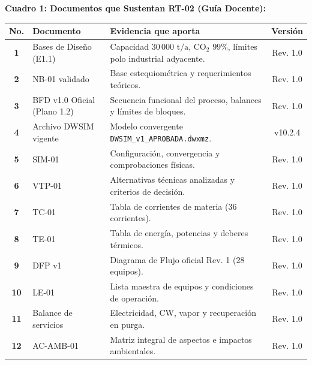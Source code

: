 \documentclass[10pt,landscape]{article}
\begin{document}
\begin{minipage}[t]{0.51\textwidth}
  \textbf{\fontsize{8pt}{9.5pt}\selectfont \color{navyblue}Cuadro 1: Documentos que Sustentan RT-02 (Guía Docente):}\par\vspace{2pt}
  \scriptsize
  \renewcommand{\arraystretch}{1.12}
  \begin{tabularx}{\linewidth}{c p{2.7cm} X c}
    \toprule
    \rowcolor{tableheader}
    \textbf{\color{white}No.} & \textbf{\color{white}Documento} & \textbf{\color{white}Evidencia que aporta} & \textbf{\color{white}Versión} \\
    \midrule
    \rowcolor{roweven}
    \textbf{1} & Bases de Diseño (E1.1) & Capacidad $30\,000\text{ t/a}$, $\text{CO}_2$ $99\%$, límites polo industrial adyacente. & Rev. 1.0 \\
    \rowcolor{rowodd}
    \textbf{2} & NB-01 validado & Base estequiométrica y requerimientos teóricos. & Rev. 1.0 \\
    \rowcolor{roweven}
    \textbf{3} & BFD v1.0 Oficial (Plano 1.2) & Secuencia funcional del proceso, balances y límites de bloques. & Rev. 1.0 \\
    \rowcolor{rowodd}
    \textbf{4} & Archivo DWSIM vigente & Modelo convergente \texttt{DWSIM\_v1\_APROBADA.dwxmz}. & v10.2.4 \\
    \rowcolor{roweven}
    \textbf{5} & SIM-01 & Configuración, convergencia y comprobaciones físicas. & Rev. 1.0 \\
    \rowcolor{rowodd}
    \textbf{6} & VTP-01 & Alternativas técnicas analizadas y criterios de decisión. & Rev. 1.0 \\
    \rowcolor{roweven}
    \textbf{7} & TC-01 & Tabla de corrientes de materia (36 corrientes). & Rev. 1.0 \\
    \rowcolor{rowodd}
    \textbf{8} & TE-01 & Tabla de energía, potencias y deberes térmicos. & Rev. 1.0 \\
    \rowcolor{roweven}
    \textbf{9} & DFP v1 & Diagrama de Flujo oficial Rev. 1 (28 equipos). & Rev. 1.0 \\
    \rowcolor{rowodd}
    \textbf{10} & LE-01 & Lista maestra de equipos y condiciones de operación. & Rev. 1.0 \\
    \rowcolor{roweven}
    \textbf{11} & Balance de servicios & Electricidad, CW, vapor y recuperación en purga. & Rev. 1.0 \\
    \rowcolor{rowodd}
    \textbf{12} & AC-AMB-01 & Matriz integral de aspectos e impactos ambientales. & Rev. 1.0 \\
    \bottomrule
  \end{tabularx}
\end{minipage}
\end{document}
